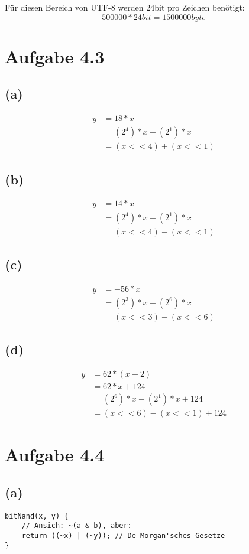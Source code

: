 \documentclass[12pt]{article}
\begin{document}
Für diesen Bereich von UTF-8 werden 24bit pro Zeichen benötigt:
\[500000 * 24bit = 1500000byte\]

\section{Aufgabe 4.3}
\subsection{(a)}
\begin{align}
y &= 18 * x\\
&= (2^4) * x + (2^1) * x\\
&= (x << 4) + (x << 1)
\end{align}
\subsection{(b)}
\begin{align}
y &= 14 * x\\
&= (2^4) * x - (2^1) * x\\
&= (x << 4) - (x << 1)
\end{align}
\subsection{(c)}
\begin{align}
y &= -56 * x\\
&= (2^3) * x - (2^6) * x\\
&= (x << 3) - (x << 6)
\end{align}
\subsection{(d)}
\begin{align}
y &= 62 * (x + 2)\\
&= 62 * x + 124\\
&= (2^6) * x - (2^1) * x + 124\\
&= (x << 6) - (x << 1) + 124
\end{align}

\section{Aufgabe 4.4}
\subsection{(a)}
\begin{verbatim}
bitNand(x, y) {
    // Ansich: ~(a & b), aber:
    return ((~x) | (~y)); // De Morgan'sches Gesetze
}
\end{verbatim}
\end{document}
